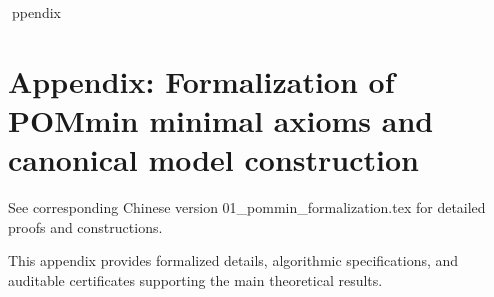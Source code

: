 ppendix

\section*{Appendix: Formalization of POMmin minimal axioms and canonical model construction}

See corresponding Chinese version 01_pommin_formalization.tex for detailed proofs and constructions.

This appendix provides formalized details, algorithmic specifications, and auditable certificates supporting the main theoretical results.
